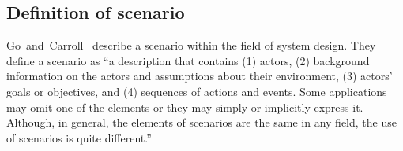 \subsection{Definition of scenario}
\label{sec:scenario definition}



Go~and~Carroll~\cite{go2004blind} describe a scenario within the field of system design. They define a scenario as ``a description that contains (1) actors, (2) background information on the actors and assumptions about their environment, (3) actors' goals or objectives, and (4) sequences of actions and events. Some applications may omit one of the elements or they may simply or implicitly express it. Although, in general, the elements of scenarios are the same in any field, the use of scenarios is quite different.'' 


